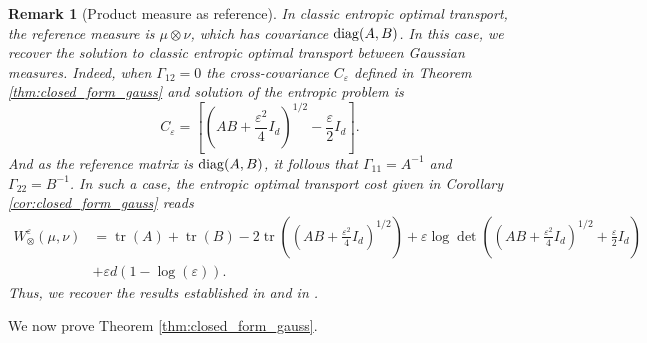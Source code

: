 \documentclass[]{article}
\def\diag{\mathop{\rm diag}\nolimits}
\DeclareMathOperator{\tr}{tr}
\numberwithin{equation}{section}
\theoremstyle{plain}
\newtheorem{rem}{Remark}[section]
\begin{document}
\begin{rem}[Product measure as reference] In classic entropic optimal transport, the reference measure is $\mu \otimes \nu$, which has covariance $\diag(A,B)$. In this case, we recover the solution to classic entropic optimal transport between Gaussian measures. Indeed, when $\Gamma_{12} = 0$  the cross-covariance $C_\varepsilon$ defined in Theorem \ref{thm:closed_form_gauss} and solution of the entropic problem is 
	\begin{equation}
		C_\varepsilon = \left[\left(AB + \frac{\varepsilon^2}{4}I_d\right)^{1/2}- \frac{\varepsilon}{2}I_d\right].
	\end{equation}
And as the reference matrix  is $\diag(A,B)$, it follows that $\Gamma_{11} = A^{-1}$ and $\Gamma_{22} = B^{-1}$. In such a case, the entropic optimal transport cost given in Corollary \ref{cor:closed_form_gauss} reads
\begin{align}
	W_\otimes^{\varepsilon}(\mu, \nu)& = \tr(A) + \tr(B) - 2 \tr\left( \left(A  B + \frac{\varepsilon^2}{4}I_d \right)^{1/2} \right) + \varepsilon \log \det\left( \left(A B + \frac{\varepsilon^2}{4}I_d\right)^{1/2}+\frac{\varepsilon}{2}I_d  \right)  \nonumber \\
	&+\varepsilon d (1 -  \log(\varepsilon) ).
\end{align} 
Thus, we recover the results established in \cite{janati2020entropic} and in \cite{mallastoEntropyregularized2WassersteinDistance2022}.
\end{rem}

We now prove Theorem \ref{thm:closed_form_gauss}.
\end{document}
